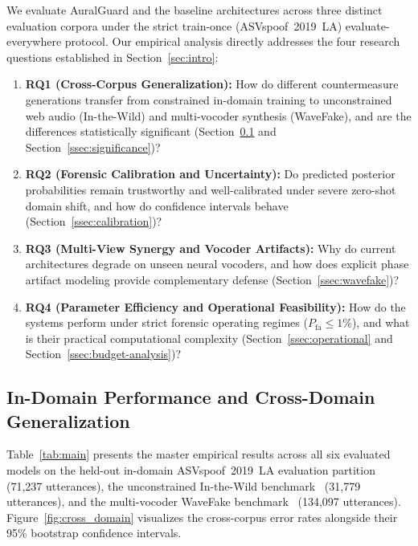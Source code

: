 
We evaluate AuralGuard and the baseline architectures across three distinct evaluation corpora under the strict train-once (ASVspoof~2019~LA) evaluate-everywhere protocol. Our empirical analysis directly addresses the four research questions established in Section~\ref{sec:intro}:
\begin{enumerate}
    \item \textbf{RQ1 (Cross-Corpus Generalization):} How do different countermeasure generations transfer from constrained in-domain training to unconstrained web audio (In-the-Wild) and multi-vocoder synthesis (WaveFake), and are the differences statistically significant (Section~\ref{ssec:generalization} and Section~\ref{ssec:significance})?
    \item \textbf{RQ2 (Forensic Calibration and Uncertainty):} Do predicted posterior probabilities remain trustworthy and well-calibrated under severe zero-shot domain shift, and how do confidence intervals behave (Section~\ref{ssec:calibration})?
    \item \textbf{RQ3 (Multi-View Synergy and Vocoder Artifacts):} Why do current architectures degrade on unseen neural vocoders, and how does explicit phase artifact modeling provide complementary defense (Section~\ref{ssec:wavefake})?
    \item \textbf{RQ4 (Parameter Efficiency and Operational Feasibility):} How do the systems perform under strict forensic operating regimes ($P_{\text{fa}} \le 1\%$), and what is their practical computational complexity (Section~\ref{ssec:operational} and Section~\ref{ssec:budget-analysis})?
\end{enumerate}

\subsection{In-Domain Performance and Cross-Domain Generalization}
\label{ssec:generalization}

Table~\ref{tab:main} presents the master empirical results across all six evaluated models on the held-out in-domain ASVspoof~2019~LA evaluation partition (71,237 utterances), the unconstrained In-the-Wild benchmark~\cite{muller2022inthewild} (31,779 utterances), and the multi-vocoder WaveFake benchmark~\cite{frank2021wavefake} (134,097 utterances). Figure~\ref{fig:cross_domain} visualizes the cross-corpus error rates alongside their 95\% bootstrap confidence intervals.

